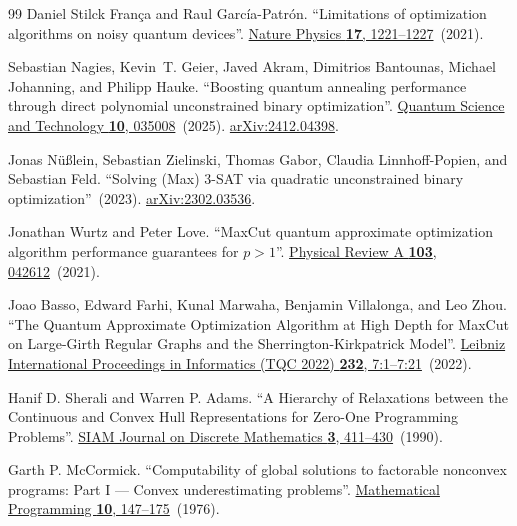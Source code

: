 \documentclass[a4paper,onecolumn,11pt,unpublished]{quantumarticle}
\theoremstyle{remark}
\begin{document}
\begin{thebibliography}{99}
Daniel Stilck França and Raul García-Patrón.
\newblock ``Limitations of optimization algorithms on noisy quantum devices''.
\newblock \href{https://doi.org/10.1038/s41567-021-01356-3}{Nature Physics {\bf 17}, 1221--1227}~(2021).

Sebastian Nagies, Kevin~T. Geier, Javed Akram, Dimitrios Bantounas, Michael Johanning, and Philipp Hauke.
\newblock ``Boosting quantum annealing performance through direct polynomial unconstrained binary optimization''.
\newblock \href{https://dx.doi.org/10.1088/2058-9565/adcae6}{Quantum Science and Technology {\bf 10}, 035008}~(2025).
\newblock \href{http://arxiv.org/abs/2412.04398}{arXiv:2412.04398}.

Jonas N{\"u}{\ss}lein, Sebastian Zielinski, Thomas Gabor, Claudia Linnhoff-Popien, and Sebastian Feld.
\newblock ``Solving (Max) 3-SAT via quadratic unconstrained binary optimization''~(2023).
\newblock \href{http://arxiv.org/abs/2302.03536}{arXiv:2302.03536}.

Jonathan Wurtz and Peter Love.
\newblock ``MaxCut quantum approximate optimization algorithm performance guarantees for $p>1$''.
\newblock \href{https://doi.org/10.1103/physreva.103.042612}{Physical Review A {\bf 103}, 042612}~(2021).

Joao Basso, Edward Farhi, Kunal Marwaha, Benjamin Villalonga, and Leo Zhou.
\newblock ``The Quantum Approximate Optimization Algorithm at High Depth for MaxCut on Large-Girth Regular Graphs and the Sherrington-Kirkpatrick Model''.
\newblock \href{https://doi.org/10.4230/lipics.tqc.2022.7}{Leibniz International Proceedings in Informatics (TQC 2022) {\bf 232}, 7:1--7:21}~(2022).

Hanif D. Sherali and Warren P. Adams.
\newblock ``A Hierarchy of Relaxations between the Continuous and Convex Hull Representations for Zero-One Programming Problems''.
\newblock \href{https://doi.org/10.1137/0403036}{SIAM Journal on Discrete Mathematics {\bf 3}, 411--430}~(1990).

Garth P. McCormick.
\newblock ``Computability of global solutions to factorable nonconvex programs: Part I --- Convex underestimating problems''.
\newblock \href{https://doi.org/10.1007/bf01580665}{Mathematical Programming {\bf 10}, 147--175}~(1976).
\end{thebibliography}
\end{document}
